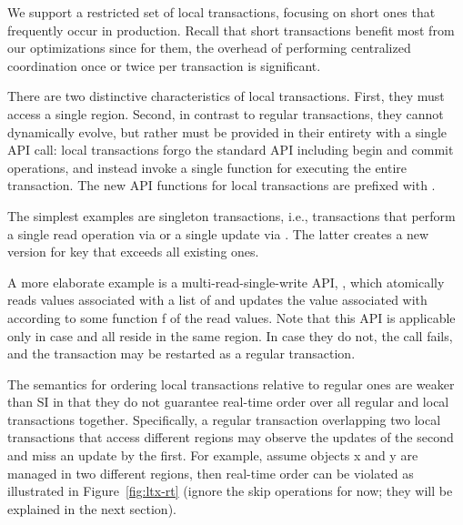 


We support a restricted set of local transactions, focusing on short ones that
frequently occur in production. Recall that short transactions benefit most from
our optimizations since for them, the overhead of performing centralized coordination once or twice
per transaction is significant.

There are two distinctive characteristics of local transactions. First, they
must access a single region. Second, in contrast to regular transactions, they
cannot dynamically evolve, but rather must be provided in their entirety with a
single API call: 
local transactions forgo the standard API including begin and commit operations,
and instead invoke a single function for executing the entire transaction. The
new API functions for local transactions are prefixed with . 

The simplest examples are singleton transactions, i.e., transactions that perform a single
read operation via  or a single update via . 
The latter creates a new version for key that exceeds all existing ones.

A more elaborate example is a multi-read-single-write API, , 
which atomically reads values associated  with a list of \rkeys and updates the value associated with
\wkey according to some function f of the read values. Note that this API
is applicable only in case \wkey and all \rkeys reside in the same region. In case
they do not, the call fails, and the transaction may be restarted as a regular
transaction.

The semantics for ordering local transactions relative to regular ones are
weaker than SI in that they do not guarantee real-time order over all regular
and local transactions together. Specifically, a regular transaction overlapping
two local transactions that access different regions may observe the updates of
the second and miss an update by the first. For example, assume objects x and y
are managed in two different regions, then real-time order can be violated as
illustrated in Figure~\ref{fig:ltx-rt} (ignore the skip operations for now; they will be explained in the next section).

